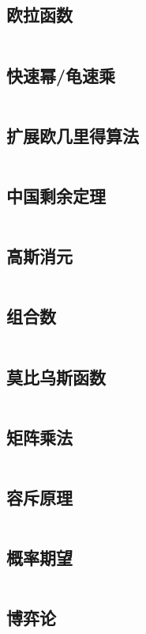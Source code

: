 \documentclass[a4paper,12pt]{article}
\begin{document}
\subsection{欧拉函数}
\inputminted[breaklines, linenos]{c++}{math/eluer.cc}
\subsection{快速幂/龟速乘}
\inputminted[breaklines, linenos]{c++}{math/qmi.cc}
\subsection{扩展欧几里得算法}
\inputminted[breaklines, linenos]{c++}{math/exgcd.cc}
\subsection{中国剩余定理}
\inputminted[breaklines, linenos]{c++}{math/crt.cc}
\subsection{高斯消元}
\inputminted[breaklines, linenos]{c++}{math/gauss.cc}
\subsection{组合数}
\inputminted[breaklines, linenos]{c++}{math/combine.cc}
\subsection{莫比乌斯函数}
\inputminted[breaklines, linenos]{c++}{math/mobius.cc}
\subsection{矩阵乘法}
\inputminted[breaklines, linenos]{c++}{math/matrix.cc}
\subsection{容斥原理}
\inputminted[breaklines, linenos]{c++}{math/rongchi.cc}
\subsection{概率期望}
\inputminted[breaklines, linenos]{c++}{math/qiwang.cc}
\subsection{博弈论}
\inputminted[breaklines, linenos]{c++}{math/game.cc}
\end{document}
